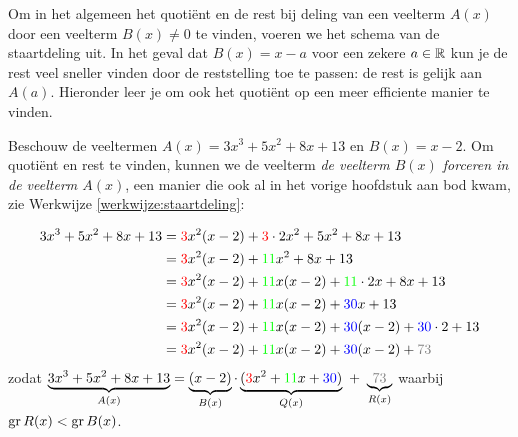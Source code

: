 \documentclass{ximera}
\begin{document}
	\author{Koen de Naeghel - Wiskunde Op Maat}
    \xmsource




Om in het algemeen het quotiënt en de rest bij deling van een veelterm $A(x)$ door een veelterm $B(x) \neq 0$ te vinden, voeren we het schema van de staartdeling uit. In het geval dat $B(x) = x-a$ voor een zekere $a \in \mathbb{R}$ kun je de rest veel sneller vinden door de reststelling toe te passen: de rest is gelijk aan $A(a)$. Hieronder leer je om ook het quotiënt op een meer efficiente manier te vinden. 

\begin{algorithm} 
Beschouw de veeltermen $A(x) = 3x^3+5x^2+8x+13$ en $B(x) = x-2$. Om quotiënt en rest te vinden, kunnen we de veelterm 
\textit{ de veelterm $B(x)$ forceren in de veelterm $A(x)$}, een manier die ook al in het vorige hoofdstuk aan bod kwam, zie Werkwijze \ref{werkwijze:staartdeling}:


\begin{align*}
3x^3+5x^2+8x+13
& = {\red{3}}x^2(x-2) + {\red{3}}\cdot 2x^2 + 5x^2 + 8x + 13 \\
& = {\red{3}}x^2(x-2) + {\green{11}}x^2 + 8x + 13 \\
& = {\red{3}}x^2(x-2) + {\green{11}}x(x-2) + {\green{11}}\cdot 2x + 8x + 13 \\
& = {\red{3}}x^2(x-2) + {\green{11}}x(x-2) + {\blue{30}}x + 13 \\
& = {\red{3}}x^2(x-2) + {\green{11}}x(x-2) + {\blue{30}}(x-2) + {\blue{30}} \cdot 2 + 13 \\
& = {\red{3}}x^2(x-2) + {\green{11}}x(x-2) + {\blue{30}}(x-2) + {\gray{73}} %
\end{align*}
zodat $\D \underbrace{3x^3+5x^2+8x+13}_{A(x)} = \underbrace{(x-2)}_{B(x)}\cdot\underbrace{({\red{3}}x^2 + {\green{11}}x + {\blue{30}})}_{Q(x)} \,\, + \,\, \underbrace{{\gray{73}}}_{R(x)}$ waarbij $\operatorname{gr} R(x) < \operatorname{gr} B(x)$.


\end{algorithm}
\end{document}
